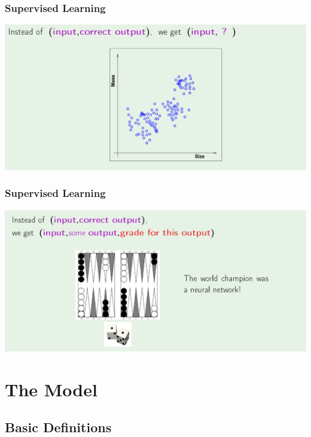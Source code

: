 \documentclass[xcolor=table]{beamer}
\begin{document}
\begin{frame}[t]
\frametitle{Supervised Learning}
\begin{center}
\includegraphics[scale=0.22]{unsupervised_learning.png}
\end{center}
\end{frame}

\begin{frame}[t]
\frametitle{Supervised Learning}
\begin{center}
\includegraphics[scale=0.22]{reinforced_learning.png}
\end{center}
\end{frame}




\section{The Model}

\subsection{Basic Definitions}
\end{document}
